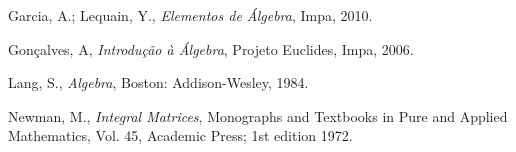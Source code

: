 \cleardoublepage
{}
{}
\renewcommand{\bibname}{Bibliografia}

\begin{thebibliography}{99}

Garcia, A.; Lequain, Y., \textit{Elementos de \'Algebra}, Impa, 2010.

Gon\c{c}alves, A, \textit{Introdu\c{c}\~ao \`a \'Algebra}, Projeto Euclides, Impa, 2006.

Lang, S., \textit{Algebra}, Boston: Addison-Wesley, 1984.

Newman, M., \textit{Integral Matrices}, Monographs and Textbooks in Pure and Applied Mathematics, Vol. 45, Academic Press; 1st edition 1972.

\end{thebibliography}
